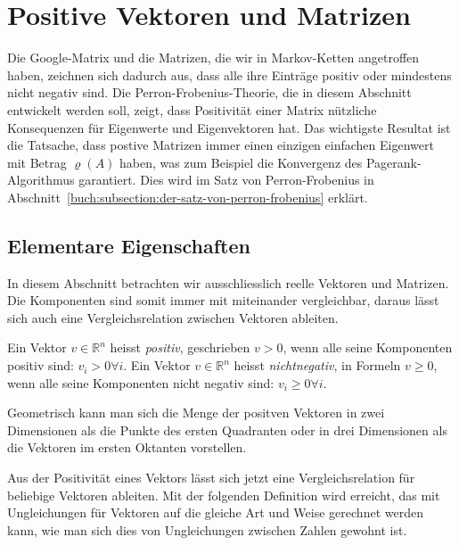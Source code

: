 %
%
%
\section{Positive Vektoren und Matrizen
\label{buch:section:positive-vektoren-und-matrizen}}
Die Google-Matrix und die Matrizen, die wir in Markov-Ketten angetroffen
haben, zeichnen sich dadurch aus, dass alle ihre Einträge positiv oder
mindestens nicht negativ sind.
Die Perron-Frobenius-Theorie, die in diesem Abschnitt entwickelt
werden soll, zeigt, dass Positivität einer Matrix nützliche
Konsequenzen für Eigenwerte und Eigenvektoren hat.
Das wichtigste Resultat ist die Tatsache, dass postive Matrizen immer
einen einzigen einfachen Eigenwert mit Betrag $\varrho(A)$ haben,
was zum Beispiel die Konvergenz des Pagerank-Algorithmus garantiert.
Dies wird im Satz von Perron-Frobenius in
Abschnitt~\ref{buch:subsection:der-satz-von-perron-frobenius}
erklärt.

%
%
\subsection{Elementare Eigenschaften
\label{buch:subsection:elementare-eigenschaften}}
In diesem Abschnitt betrachten wir ausschliesslich reelle Vektoren
und Matrizen.
Die Komponenten sind somit immer mit miteinander vergleichbar, daraus
lässt sich auch eine Vergleichsrelation zwischen Vektoren
ableiten.

\begin{definition}
Ein Vektor $v\in\mathbb{R}^n$ heisst {\em positiv}, geschrieben
$v>0$, wenn alle seine Komponenten positiv sind: $v_i>0\forall i$.
Ein Vektor $v\in\mathbb{R}^n$ heisst {\em nichtnegativ}, in Formeln
$v\ge 0$, wenn alle
seine Komponenten nicht negativ sind: $v_i\ge 0\forall i$.
%
%
\end{definition}

Geometrisch kann man sich die Menge der positven Vektoren in zwei Dimensionen
als die Punkte des ersten Quadranten oder in drei Dimensionen als die
Vektoren im ersten Oktanten vorstellen.

Aus der Positivität eines Vektors lässt sich jetzt eine Vergleichsrelation
für beliebige Vektoren ableiten.
Mit der folgenden Definition wird erreicht, das mit Ungleichungen für Vektoren
auf die gleiche Art und Weise gerechnet werden kann, wie man sich
dies von Ungleichungen zwischen Zahlen gewohnt ist.


